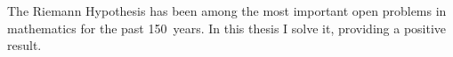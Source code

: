 %
The Riemann Hypothesis has been among the most important open
problems in mathematics for the past 150~years. In this thesis
I solve it, providing a positive result.
